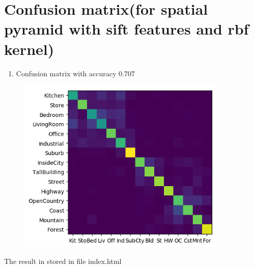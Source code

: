 \section*{Confusion matrix(for spatial pyramid with sift features and rbf kernel)}

\begin{enumerate}
    \item Confusion matrix with accuracy 0.707
\end{enumerate}

\begin{figure}[h]
    \centering
    \includegraphics[width=10cm]{confusion_matrix.png}
\end{figure}

The result in stored in file index.html

 